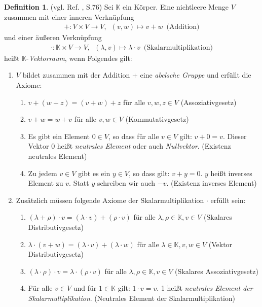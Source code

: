\documentclass[10pt,a4paper]{article}
\theoremstyle{plain}
\theoremstyle{definition}
\newtheorem{definition}[satz]{Definition}
\newenvironment{dfi}{\begin{shaded}\begin{definition}}{\end{definition}\end{shaded}}
\theoremstyle{nonumberplain}
\newcommand{\K}{\mathbb{K}}
\begin{document}
\begin{dfi}
\label{vektorraum}
(vgl. Ref. \cite{Fischer}, S.76) Sei $\K$ ein Körper. Eine nichtleere Menge $V$ zusammen mit einer inneren Verknüpfung
\begin{align*}
+ : V \times V \rightarrow V, \enspace (v, w) \mapsto v + w \enspace \text{(Addition)}
\end{align*}
und einer äußeren Verknüpfung
\begin{align*}
\cdot : \K \times V \rightarrow V, \enspace (\lambda, v) \mapsto \lambda \cdot v \enspace \text{(Skalarmultiplikation)}
\end{align*}
heißt $\K$-\textit{Vektorraum}, wenn Folgendes gilt:
\begin{enumerate}[label=(\roman*)]
\item $V$ bildet zusammen mit der Addition + eine \textit{abelsche Gruppe} und erfüllt die Axiome:
\begin{enumerate}[label=(\arabic*)]
\item $v + (w + z) = (v + w) + z$ für alle $v,w,z \in V$ (Assoziativgesetz)
\item $v + w = w + v$ für alle $v,w \in V$ (Kommutativgesetz)
\item Es gibt ein Element $0 \in V$, so dass für alle $v \in V$ gilt: $v + 0 = v$. Dieser Vektor $0$ heißt \textit{neutrales Element} oder auch \textit{Nullvektor}. (Existenz neutrales Element)
\item Zu jedem $v \in V$ gibt es ein $y \in V$, so dass gilt: $v + y = 0$. $y$ heißt inverses Element zu $v$. Statt $y$ schreiben wir auch $-v$. (Existenz inverses Element)
\end{enumerate}
\item Zusätzlich müssen folgende Axiome der Skalarmultiplikation $\cdot$ erfüllt sein:
\begin{enumerate}[label=(\arabic*)]
\item $(\lambda + \rho) \cdot v = (\lambda \cdot v) + (\rho \cdot v)$ für alle $\lambda,\rho \in \K, v \in V$ (Skalares Distributivgesetz)
\item $ \lambda \cdot (v + w) = (\lambda \cdot v) + (\lambda \cdot w)$ für alle $\lambda \in \K, v,w \in V$ (Vektor Distributivgesetz)
\item $(\lambda \cdot \rho) \cdot v = \lambda \cdot (\rho \cdot v)$ für alle $\lambda,\rho \in \K, v \in V$ (Skalares Assoziativgesetz)
\item Für alle $v \in V$ und für $1 \in \K$ gilt: $1 \cdot v = v$. 1 heißt \textit{neutrales Element der Skalarmultiplikation}. (Neutrales Element der Skalarmultiplikation)
\end{enumerate}
\end{enumerate}
\end{dfi}
\end{document}
